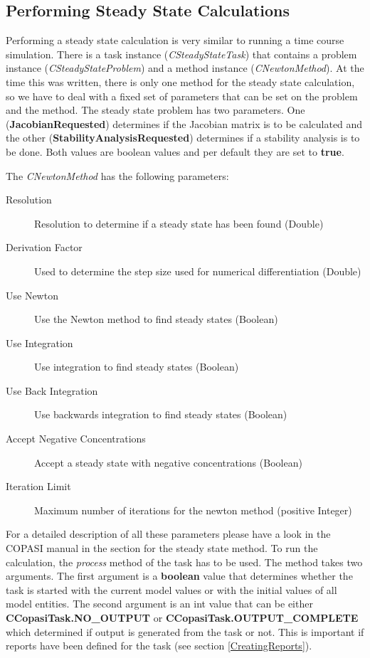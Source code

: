 \documentclass[a4,10pt]{article}
\begin{document}
\subsection{Performing Steady State Calculations}
Performing a steady state calculation is very similar to running a time course simulation. There is a task instance (\textit{CSteadyStateTask}) that contains a problem instance (\textit{CSteadyStateProblem}) and a method instance (\textit{CNewtonMethod}).
At the time this was written, there is only one method for the steady state calculation, so we have to deal with a fixed set of parameters that can be set on the problem and the method.
The steady state problem has two parameters. One (\textbf{JacobianRequested}) determines if the Jacobian matrix is to be calculated and the other (\textbf{StabilityAnalysisRequested}) determines if a stability analysis is to be done. Both values are boolean values and per default they are set to \textbf{true}.

The \textit{CNewtonMethod} has the following parameters:

\begin{description}
\item[Resolution]{Resolution to determine if a steady state has been found (Double)}
\item[Derivation Factor]{Used to determine the step size used for numerical differentiation (Double)}
\item[Use Newton]{Use the Newton method to find steady states (Boolean) }
\item[Use Integration]{Use integration to find steady states (Boolean)}
\item[Use Back Integration]{Use backwards integration to find steady states (Boolean)}
\item[Accept Negative Concentrations]{Accept a steady state with negative concentrations (Boolean)}
\item[Iteration Limit]{Maximum number of iterations for the newton method (positive Integer)}
\end{description}

For a detailed description of all these parameters please have a look in the COPASI manual in the section for the steady state method.
To run the calculation, the \textit{process} method of the task has to be used. The method takes two arguments. The first argument is a \textbf{boolean} value that determines whether the task is started with the current model values or with the initial values of all model entities. The second argument is an int value that can be either \textbf{CCopasiTask.NO\_OUTPUT} or \textbf{CCopasiTask.OUTPUT\_COMPLETE} which determined if output is generated from the task or not. This is important if reports have been defined for the task (see section \ref{CreatingReports}). 
\end{document}
